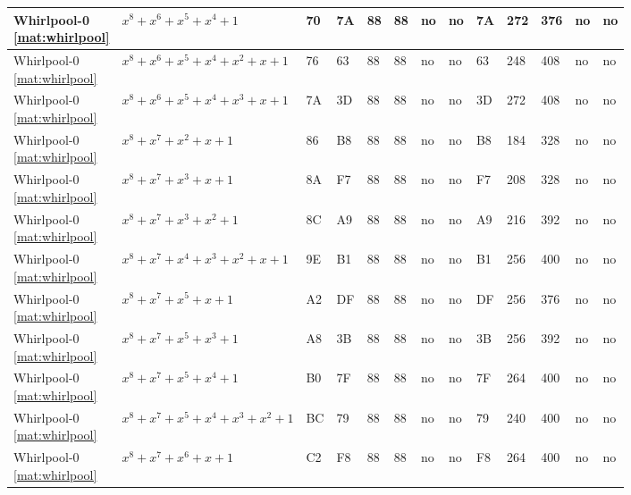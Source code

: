 \begin{tiny}
\begin{longtable}{|l|l|l|l|l|l|l|l|l|l|l|l|l|}
\shortstack{Whirlpool-0 \\ \eqref{mat:whirlpool}} & $x^8 + x^6 + x^5 + x^4 + 1$ & 70 & 7A & 88 & 88 & no & no & 7A & 272 & 376 & no & no \\ \hline
\shortstack{Whirlpool-0 \\ \eqref{mat:whirlpool}} & $x^8 + x^6 + x^5 + x^4 + x^2 + x + 1$ & 76 & 63 & 88 & 88 & no & no & 63 & 248 & 408 & no & no \\ \hline
\shortstack{Whirlpool-0 \\ \eqref{mat:whirlpool}} & $x^8 + x^6 + x^5 + x^4 + x^3 + x + 1$ & 7A & 3D & 88 & 88 & no & no & 3D & 272 & 408 & no & no \\ \hline
\shortstack{Whirlpool-0 \\ \eqref{mat:whirlpool}} & $x^8 + x^7 + x^2 + x + 1$ & 86 & B8 & 88 & 88 & no & no & B8 & 184 & 328 & no & no \\ \hline
\shortstack{Whirlpool-0 \\ \eqref{mat:whirlpool}} & $x^8 + x^7 + x^3 + x + 1$ & 8A & F7 & 88 & 88 & no & no & F7 & 208 & 328 & no & no \\ \hline
\shortstack{Whirlpool-0 \\ \eqref{mat:whirlpool}} & $x^8 + x^7 + x^3 + x^2 + 1$ & 8C & A9 & 88 & 88 & no & no & A9 & 216 & 392 & no & no \\ \hline
\shortstack{Whirlpool-0 \\ \eqref{mat:whirlpool}} & $x^8 + x^7 + x^4 + x^3 + x^2 + x + 1$ & 9E & B1 & 88 & 88 & no & no & B1 & 256 & 400 & no & no \\ \hline
\shortstack{Whirlpool-0 \\ \eqref{mat:whirlpool}} & $x^8 + x^7 + x^5 + x + 1$ & A2 & DF & 88 & 88 & no & no & DF & 256 & 376 & no & no \\ \hline
\shortstack{Whirlpool-0 \\ \eqref{mat:whirlpool}} & $x^8 + x^7 + x^5 + x^3 + 1$ & A8 & 3B & 88 & 88 & no & no & 3B & 256 & 392 & no & no \\ \hline
\shortstack{Whirlpool-0 \\ \eqref{mat:whirlpool}} & $x^8 + x^7 + x^5 + x^4 + 1$ & B0 & 7F & 88 & 88 & no & no & 7F & 264 & 400 & no & no \\ \hline
\shortstack{Whirlpool-0 \\ \eqref{mat:whirlpool}} & $x^8 + x^7 + x^5 + x^4 + x^3 + x^2 + 1$ & BC & 79 & 88 & 88 & no & no & 79 & 240 & 400 & no & no \\ \hline
\shortstack{Whirlpool-0 \\ \eqref{mat:whirlpool}} & $x^8 + x^7 + x^6 + x + 1$ & C2 & F8 & 88 & 88 & no & no & F8 & 264 & 400 & no & no \\ \hline

\end{longtable}
\end{tiny}
